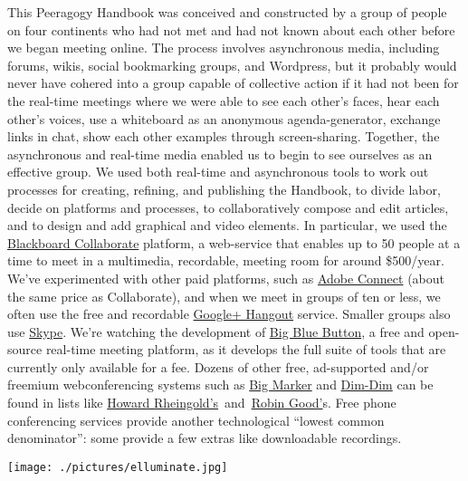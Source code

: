 This Peeragogy Handbook was conceived and constructed by a group of
people on four continents who had not met and had not known about each
other before we began meeting online. The process involves asynchronous
media, including forums, wikis, social bookmarking groups, and
Wordpress, but it probably would never have cohered into a group capable
of collective action if it had not been for the real-time meetings where
we were able to see each other's faces, hear each other's voices, use a
whiteboard as an anonymous agenda-generator, exchange links in chat,
show each other examples through screen-sharing. Together, the
asynchronous and real-time media enabled us to begin to see ourselves as
an effective group. We used both real-time and asynchronous tools to
work out processes for creating, refining, and publishing the Handbook,
to divide labor, decide on platforms and processes, to collaboratively
compose and edit articles, and to design and add graphical and video
elements. In particular, we used the
\href{http://www.blackboard.com/platforms/collaborate/overview.aspx}{Blackboard
Collaborate} platform, a web-service that enables up to 50 people at a
time to meet in a multimedia, recordable, meeting room for around
\$500/year. We've experimented with other paid platforms, such as
\href{http://success.adobe.com/en/na/sem/products/connect/1109\_6011\_connect\_webinars.html}{Adobe
Connect} (about the same price as Collaborate), and when we meet in
groups of ten or less, we often use the free and recordable
\href{http://www.google.com/+/learnmore/hangouts/}{Google+ Hangout}
service. Smaller groups also use \href{http://www.skype.com}{Skype}.
We're watching the development of
\href{http://www.bigbluebutton.org/}{Big Blue Button}, a free and
open-source real-time meeting platform, as it develops the full suite of
tools that are currently only available for a fee. Dozens of other free,
ad-supported and/or freemium webconferencing systems such as
\href{http://www.bigmarker.com/about}{Big Marker} and
\href{http://www.dimdim.com}{Dim-Dim} can be found in lists like
\href{http://delicious.com/hrheingold/webconferencing}{Howard
Rheingold's}~and~\href{http://www.mindmeister.com/12213323/best-online-collaboration-tools-2012-robin-good-s-collaborative-map}{Robin
Good'}s. Free phone conferencing services provide another technological
``lowest common denominator'': some provide a few extras like
downloadable recordings.

\begin{center}
\texttt{[image: ./pictures/elluminate.jpg]}
\end{center}

